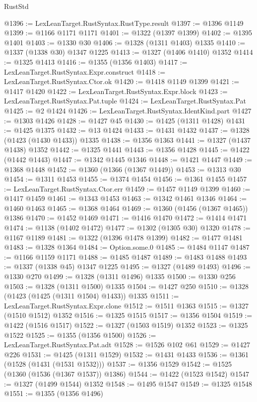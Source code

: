 \begin{lexlean}{RustStd}
\begin{coremodule}
@1396 := LexLeanTarget.RustSyntax.RustType.result
@1397 := @1396 @1149
@1399 := @1166 @1171 @1171
@1401 := @1322 (@1397 @1399)
@1402 := @1395 @1401
@1403 := @1330 @30
@1406 := @1328 (@1311 @1403) @1335
@1410 := @1337 (@1338 @30) @1347 @1225
@1413 := @1327 (@1406 @1410) @1352
@1414 := @1325 @1413
@1416 := @1355 (@1356 @1403)
@1417 := LexLeanTarget.RustSyntax.Expr.construct
@1418 := LexLeanTarget.RustSyntax.Ctor.ok
@1420 := @1418 @1149 @1399
@1421 := @1417 @1420
@1422 := LexLeanTarget.RustSyntax.Expr.block
@1423 := LexLeanTarget.RustSyntax.Pat.tuple
@1424 := LexLeanTarget.RustSyntax.Pat
@1425 := @2 @1424
@1426 := LexLeanTarget.RustSyntax.IdentKind.part
@1427 := @1303 @1426
@1428 := @1427 @45
@1430 := @1425 (@1311 @1428)
@1431 := @1425 @1375
@1432 := @13 @1424
@1433 := @1431 @1432
@1437 := @1328 (@1423 (@1430 @1433)) @1335
@1438 := @1356 @1363
@1441 := @1327 (@1437 @1438) @1352
@1442 := @1325 @1441
@1443 := @1356 @1428
@1445 := @1422 (@1442 @1443)
@1447 := @1342 @1445 @1346
@1448 := @1421 @1447
@1449 := @1368 @1448
@1452 := @1360 (@1366 (@1367 @1449))
@1453 := @1313 @30
@1454 := @1311 @1453
@1455 := @1374 @1454
@1456 := @1361 @1455
@1457 := LexLeanTarget.RustSyntax.Ctor.err
@1459 := @1457 @1149 @1399
@1460 := @1417 @1459
@1461 := @1343 @1453
@1463 := @1342 @1461 @1346
@1464 := @1460 @1463
@1465 := @1368 @1464
@1469 := @1360 (@1456 (@1367 @1465)) @1386
@1470 := @1452 @1469
@1471 := @1416 @1470
@1472 := @1414 @1471
@1474 := @1138 (@1402 @1472)
@1477 := @1302 (@1305 @30) @1320
@1478 := @1167 @1189
@1481 := @1322 (@1396 @1478 @1399)
@1482 := @1477 @1481
@1483 := @1328 @1364
@1484 := Option.some.{0}
@1485 := @1484 @1147
@1487 := @1166 @1159 @1171
@1488 := @1485 @1487
@1489 := @1483 @1488
@1493 := @1337 (@1338 @45) @1347 @1225
@1495 := @1327 (@1489 @1493)
@1496 := @1330 @270
@1499 := @1328 (@1311 @1496) @1335
@1500 := @1330 @256
@1503 := @1328 (@1311 @1500) @1335
@1504 := @1427 @250
@1510 := @1328 (@1423 (@1425 (@1311 @1504) @1433)) @1335
@1511 := LexLeanTarget.RustSyntax.Expr.clone
@1512 := @1511 @1363
@1515 := @1327 (@1510 @1512) @1352
@1516 := @1325 @1515
@1517 := @1356 @1504
@1519 := @1422 (@1516 @1517)
@1522 := @1327 (@1503 @1519) @1352
@1523 := @1325 @1522
@1525 := @1355 (@1356 @1500)
@1526 := LexLeanTarget.RustSyntax.Pat.adt
@1528 := @1526 @102 @61
@1529 := @1427 @226
@1531 := @1425 (@1311 @1529)
@1532 := @1431 @1433
@1536 := @1361 (@1528 (@1431 (@1531 @1532)))
@1537 := @1356 @1529
@1542 := @1525 (@1360 (@1536 (@1367 @1537)) @1386)
@1544 := @1422 (@1523 @1542)
@1547 := @1327 (@1499 @1544) @1352
@1548 := @1495 @1547
@1549 := @1325 @1548
@1551 := @1355 (@1356 @1496)

\end{coremodule}
\end{lexlean}

